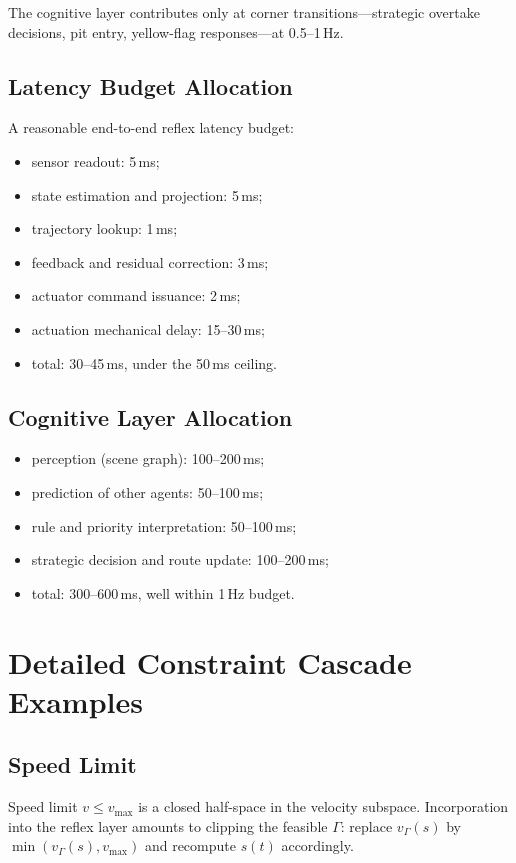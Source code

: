 \documentclass[11pt,twocolumn]{article}
\theoremstyle{definition}
\theoremstyle{remark}
\begin{document}
The cognitive layer contributes only at corner transitions---strategic overtake decisions, pit entry, yellow-flag responses---at 0.5--1\,Hz.

\subsection{Latency Budget Allocation}

A reasonable end-to-end reflex latency budget:
\begin{itemize}[leftmargin=*,itemsep=2pt]
\item sensor readout: 5\,ms;
\item state estimation and projection: 5\,ms;
\item trajectory lookup: 1\,ms;
\item feedback and residual correction: 3\,ms;
\item actuator command issuance: 2\,ms;
\item actuation mechanical delay: 15--30\,ms;
\item total: 30--45\,ms, under the 50\,ms ceiling.
\end{itemize}

\subsection{Cognitive Layer Allocation}

\begin{itemize}[leftmargin=*,itemsep=2pt]
\item perception (scene graph): 100--200\,ms;
\item prediction of other agents: 50--100\,ms;
\item rule and priority interpretation: 50--100\,ms;
\item strategic decision and route update: 100--200\,ms;
\item total: 300--600\,ms, well within 1\,Hz budget.
\end{itemize}

\section{Detailed Constraint Cascade Examples}
\label{app:cascade-examples}

\subsection{Speed Limit}

Speed limit $v \le v_{\max}$ is a closed half-space in the velocity subspace. Incorporation into the reflex layer amounts to clipping the feasible $\Gamma$: replace $v_{\Gamma}(s)$ by $\min(v_{\Gamma}(s), v_{\max})$ and recompute $s(t)$ accordingly.
\end{document}
